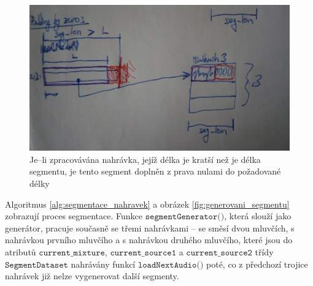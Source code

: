 \begin{figure}[H]
    \centering
    \includegraphics[scale=0.30]{obrazky-figures/minibatch_segmentace_padding.jpg}
    \caption{\label{fig:segmentace_padding}Je--li zpracovávána nahrávka, jejíž délka je kratší než je délka segmentu, je tento segment doplněn z prava nulami do požadované délky}
\end{figure}

Algoritmus \ref{alg:segmentace_nahravek} a obrázek \ref{fig:generovani_segmentu} zobrazují proces segmentace. Funkce $\texttt{segmentGenerator()}$, která slouží jako generátor, pracuje současně se třemi nahrávkami -- se směsí dvou mluvčích, s nahrávkou prvního mluvčího a s nahrávkou druhého mluvčího, které jsou do atributů $\texttt{current\_mixture}$, $\texttt{current\_source1}$ a $\texttt{current\_source2}$ třídy $\texttt{SegmentDataset}$ nahrávány funkcí $\texttt{loadNextAudio()}$ poté, co z předchozí trojice nahrávek již nelze vygenerovat další segmenty.

\bigskip

